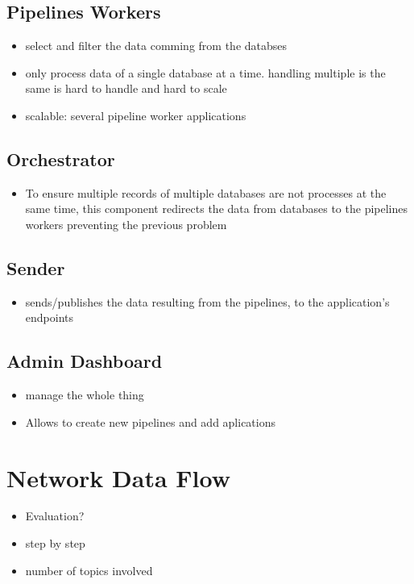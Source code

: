 \subsection{Pipelines Workers}
\begin{itemize}
    \item select and filter the data comming from the databses
    \item only process data of a single database at a time. handling multiple is the same is hard to handle and hard to scale
    \item scalable: several pipeline worker applications
\end{itemize}
\subsection{Orchestrator}
\begin{itemize}
    \item To ensure multiple records of multiple databases are not processes at the same time, this component redirects the data from databases to the pipelines workers preventing the previous problem
\end{itemize}
\subsection{Sender}
\begin{itemize}
    \item sends/publishes the data resulting from the pipelines, to the application's endpoints
\end{itemize}
\subsection{Admin Dashboard}
\begin{itemize}
    \item manage the whole thing
    \item Allows to create new pipelines and add aplications
\end{itemize}

\section{Network Data Flow}
\begin{itemize}
    \item Evaluation?
    \item step by step
    \item number of topics involved
\end{itemize}
